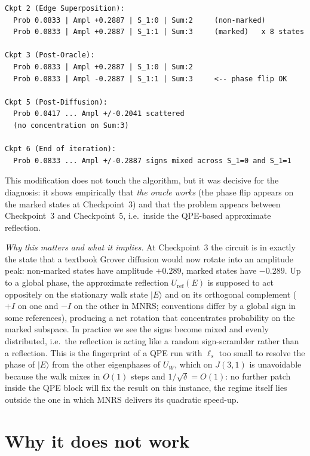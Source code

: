 \documentclass[11pt,a4paper]{article}
\begin{document}
\begin{lstlisting}[style=plain]
Ckpt 2 (Edge Superposition):
  Prob 0.0833 | Ampl +0.2887 | S_1:0 | Sum:2     (non-marked)
  Prob 0.0833 | Ampl +0.2887 | S_1:1 | Sum:3     (marked)   x 8 states

Ckpt 3 (Post-Oracle):
  Prob 0.0833 | Ampl +0.2887 | S_1:0 | Sum:2
  Prob 0.0833 | Ampl -0.2887 | S_1:1 | Sum:3     <-- phase flip OK

Ckpt 5 (Post-Diffusion):
  Prob 0.0417 ... Ampl +/-0.2041 scattered
  (no concentration on Sum:3)

Ckpt 6 (End of iteration):
  Prob 0.0833 ... Ampl +/-0.2887 signs mixed across S_1=0 and S_1=1
\end{lstlisting}

This modification does not touch the algorithm, but it was decisive
for the diagnosis: it shows empirically that \emph{the oracle works}
(the phase flip appears on the marked states at Checkpoint~3) and that
the problem appears between Checkpoint~3 and Checkpoint~5, i.e.\
inside the QPE-based approximate reflection.

\emph{Why this matters and what it implies.} At Checkpoint~3 the
circuit is in exactly the state that a textbook Grover diffusion
would now rotate into an amplitude peak: non-marked states have
amplitude $+0.289$, marked states have $-0.289$. Up to a global
phase, the approximate reflection $U_{\mathrm{ref}}(E)$ is supposed
to act oppositely on the stationary walk state $|E\rangle$ and on
its orthogonal complement ($+I$ on one and $-I$ on the other in
MNRS; conventions differ by a global sign in some references),
producing a net rotation that concentrates probability on the marked
subspace. In practice we see the signs become mixed and evenly
distributed, i.e.\ the reflection is acting like a random
sign-scrambler rather than a reflection. This is the fingerprint of
a QPE run with $\ell_s$ too small to resolve the phase of $|E\rangle$
from the other eigenphases of $U_W$, which on $J(3,1)$ is unavoidable
because the walk mixes in $O(1)$ steps and $1/\sqrt{\delta}=O(1)$: no
further patch inside the QPE block will fix the result on this
instance, the regime itself lies outside the one in which MNRS
delivers its quadratic speed-up.

\section{Why it does not work}
\label{sec:diag}
\end{document}
